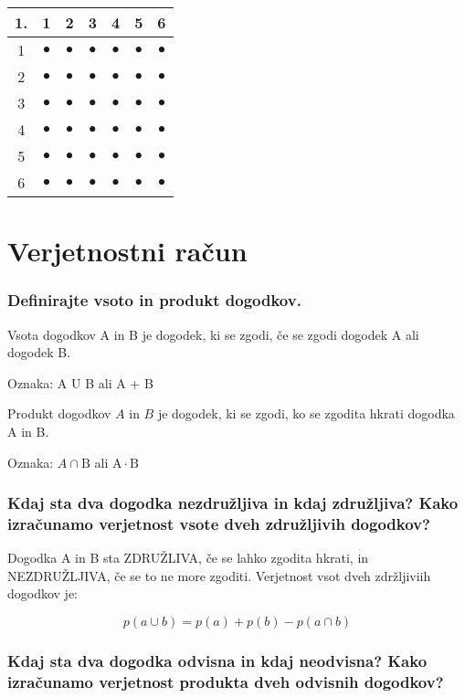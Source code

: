 \documentclass{article}
\begin{document}
\begin{center}
\begin{tabular}{|c|c|c|c|c|c|c|}
\hline
1. & 1 & 2 & 3 & 4 & 5 & 6 \\
\hline
1 & $\bullet$ & $\bullet$ & $\bullet$ & $\bullet$ & $\bullet$ & $\bullet$ \\
\hline
2 & $\bullet$ & $\bullet$ & $\bullet$ & $\bullet$ & $\bullet$ & $\bullet$ \\
\hline
3 & $\bullet$ & $\bullet$ & $\bullet$ & $\bullet$ & $\bullet$ & $\bullet$ \\
\hline
4 & $\bullet$ & $\bullet$ & $\bullet$ & $\bullet$ & $\bullet$ & $\bullet$ \\
\hline
5 & $\bullet$ & $\bullet$ & $\bullet$ & $\bullet$ & $\bullet$ & $\bullet$ \\
\hline
6 & $\bullet$ & $\bullet$ & $\bullet$ & $\bullet$ & $\bullet$ & $\bullet$ \\
\hline
\end{tabular}
\end{center}

\section{Verjetnostni račun}
\subsubsection*{Definirajte vsoto in produkt dogodkov.}

Vsota dogodkov A in B je dogodek, ki se zgodi, če se zgodi dogodek A ali dogodek B.

Oznaka: A U B ali A + B

Produkt dogodkov $A$ in $B$ je dogodek, ki se zgodi, ko se zgodita hkrati dogodka A in B.

Oznaka: $A \cap \mathrm{B}$ ali $\mathrm{A} \cdot \mathrm{B}$

\subsubsection*{Kdaj sta dva dogodka nezdružljiva in kdaj združljiva? Kako izračunamo verjetnost vsote dveh združljivih dogodkov?}

Dogodka A in B sta ZDRUŽLIVA, če se lahko zgodita hkrati, in NEZDRUŽLJIVA, če se to ne more zgoditi. Verjetnost vsot dveh zdržljiviih dogodkov je:

$$
p(a \cup b)=p(a)+p(b)-p(a \cap b)
$$

\subsubsection*{Kdaj sta dva dogodka odvisna in kdaj neodvisna? Kako izračunamo verjetnost produkta dveh odvisnih dogodkov?}
\end{document}
